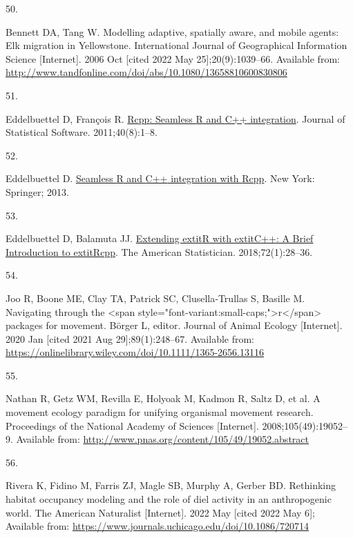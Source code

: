 \documentclass[10pt,a4paper]{article}
\newlength{\cslhangindent}
\newlength{\csllabelwidth}
\newlength{\cslentryspacingunit} %
\newenvironment{CSLReferences}[2] %
 {%
  \setlength{\parindent}{0pt}
  \ifodd #1
  \let\oldpar\par
  \def\par{\hangindent=\cslhangindent\oldpar}
  \fi
  \setlength{\parskip}{#2\cslentryspacingunit}
 }%
 {}
\newcommand{\CSLLeftMargin}[1]{\parbox[t]{\csllabelwidth}{#1}}
\newcommand{\CSLRightInline}[1]{\parbox[t]{\linewidth - \csllabelwidth}{#1}\break}
\begin{document}
\begin{CSLReferences}{0}{0}
\leavevmode{}%
\CSLLeftMargin{50. }
\CSLRightInline{Bennett DA, Tang W. Modelling adaptive, spatially aware, and mobile agents: {Elk} migration in {Yellowstone}. International Journal of Geographical Information Science {[}Internet{]}. 2006 Oct {[}cited 2022 May 25{]};20(9):1039--66. Available from: \url{http://www.tandfonline.com/doi/abs/10.1080/13658810600830806}}

\leavevmode{}%
\CSLLeftMargin{51. }
\CSLRightInline{Eddelbuettel D, François R. \href{https://doi.org/10.18637/jss.v040.i08}{{Rcpp}: Seamless {R} and {C++} integration}. Journal of Statistical Software. 2011;40(8):1--8. }

\leavevmode{}%
\CSLLeftMargin{52. }
\CSLRightInline{Eddelbuettel D. \href{https://doi.org/10.1007/978-1-4614-6868-4}{Seamless {R} and {C++} integration with {Rcpp}}. New York: Springer; 2013. }

\leavevmode{}%
\CSLLeftMargin{53. }
\CSLRightInline{Eddelbuettel D, Balamuta JJ. \href{https://doi.org/10.1080/00031305.2017.1375990}{{Extending extit{R} with extit{C++}: A Brief Introduction to extit{Rcpp}}}. The American Statistician. 2018;72(1):28--36. }

\leavevmode{}%
\CSLLeftMargin{54. }
\CSLRightInline{Joo R, Boone ME, Clay TA, Patrick SC, Clusella‐Trullas S, Basille M. Navigating through the {\textless{}}span style="font-variant:small-caps;"{\textgreater{}}r{\textless{}}/span{\textgreater{}} packages for movement. Börger L, editor. Journal of Animal Ecology {[}Internet{]}. 2020 Jan {[}cited 2021 Aug 29{]};89(1):248--67. Available from: \url{https://onlinelibrary.wiley.com/doi/10.1111/1365-2656.13116}}

\leavevmode{}%
\CSLLeftMargin{55. }
\CSLRightInline{Nathan R, Getz WM, Revilla E, Holyoak M, Kadmon R, Saltz D, et al. A movement ecology paradigm for unifying organismal movement research. Proceedings of the National Academy of Sciences {[}Internet{]}. 2008;105(49):19052--9. Available from: \url{http://www.pnas.org/content/105/49/19052.abstract}}

\leavevmode{}%
\CSLLeftMargin{56. }
\CSLRightInline{Rivera K, Fidino M, Farris ZJ, Magle SB, Murphy A, Gerber BD. Rethinking habitat occupancy modeling and the role of diel activity in an anthropogenic world. The American Naturalist {[}Internet{]}. 2022 May {[}cited 2022 May 6{]}; Available from: \url{https://www.journals.uchicago.edu/doi/10.1086/720714}}


\end{CSLReferences}
\end{document}
